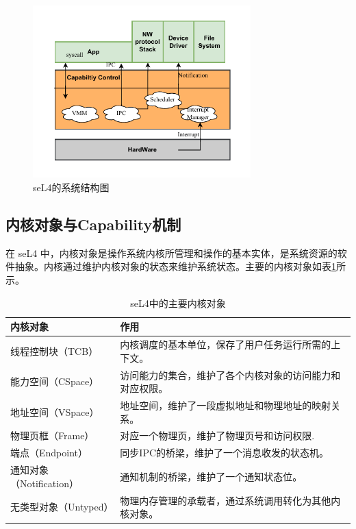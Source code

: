 \begin{figure}[htbp]
  \centering
  \includegraphics[width=0.75\textwidth]{figures/seL4_framwork.drawio.pdf}
  \caption{seL4的系统结构图}\label{fig:seL4_frramework}
\end{figure}

\subsection{内核对象与Capability机制}

在 seL4 中，内核对象是操作系统内核所管理和操作的基本实体，是系统资源的软件抽象。内核通过维护内核对象的状态来维护系统状态。主要的内核对象如表\ref{tab:kernel_object}所示。

\begin{table}[htbp]
  \centering
  \begin{tabular*}{1.0\textwidth}{@{\extracolsep{\fill}}ll}
  \toprule
    内核对象			&作用	 \\
  \midrule
    线程控制块（TCB）			&内核调度的基本单位，保存了用户任务运行所需的上下文。 \\
    能力空间（CSpace）			&访问能力的集合，维护了各个内核对象的访问能力和对应权限。	 \\
    地址空间（VSpace） &地址空间，维护了一段虚拟地址和物理地址的映射关系。	 \\
    物理页框（Frame）  &对应一个物理页，维护了物理页号和访问权限.\\
    端点（Endpoint）	&同步IPC的桥梁，维护了一个消息收发的状态机。 \\
    通知对象（Notification） &通知机制的桥梁，维护了一个通知状态位。\\
    无类型对象（Untyped）&物理内存管理的承载者，通过系统调用转化为其他内核对象。 \\
  \bottomrule
  \end{tabular*}
  \caption{seL4中的主要内核对象} \label{tab:kernel_object}
\end{table}

